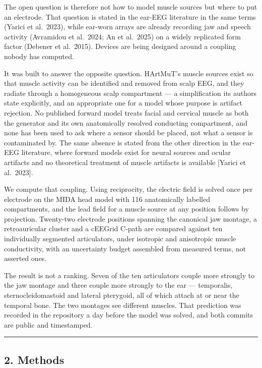 \documentclass[
  11pt,
  letterpaper,
]{article}
\newcounter{none} %
\begin{document}
The open question is therefore not how to model muscle sources but where to
put an electrode. That question is stated in the ear-EEG literature in the
same terms (Yarici et al.~2023), while ear-worn arrays are already recording
jaw and speech activity (Avramidou et al.~2024; An et al.~2025) on a widely
replicated form factor (Debener et al.~2015). Devices are being designed
around a coupling nobody has computed.

It was built to answer the opposite question. HArtMuT's muscle sources exist so
that muscle activity can be identified and removed from scalp EEG, and they
radiate through a homogeneous scalp compartment --- a simplification its authors
state explicitly, and an appropriate one for a model whose purpose is artifact
rejection. No published forward model treats facial and cervical muscle as both
the generator and its own anatomically resolved conducting compartment, and none
has been used to ask where a sensor should be placed, not what a sensor is
contaminated by. The same absence is stated from the other direction in the
ear-EEG literature, where forward models exist for neural sources and ocular
artifacts and no theoretical treatment of muscle artifacts is available {[}Yarici
et al.~2023{]}.

We compute that coupling. Using reciprocity, the electric field is solved once
per electrode on the MIDA head model with 116 anatomically labelled
compartments, and the lead field for a muscle source at any position follows by
projection. Twenty-two electrode positions spanning the canonical jaw montage, a
retroauricular cluster and a cEEGrid C-path are compared against ten
individually segmented articulators, under isotropic and anisotropic muscle
conductivity, with an uncertainty budget assembled from measured terms, not
asserted ones.

The result is not a ranking. Seven of the ten articulators couple more strongly
to the jaw montage and three couple more strongly to the ear --- temporalis,
sternocleidomastoid and lateral pterygoid, all of which attach at or near the
temporal bone. The two montages see different muscles. That prediction was
recorded in the repository a day before the model was solved, and both commits
are public and timestamped.

\begin{center}\rule{0.5\linewidth}{0.5pt}\end{center}

\subsection{2. Methods}\label{methods}
\end{document}
